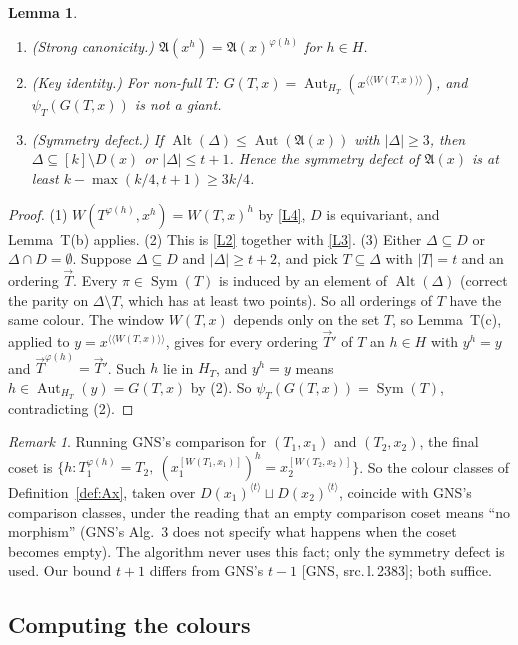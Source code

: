 \documentclass[11pt]{article}
\theoremstyle{plain}
\newtheorem{lemma}[theorem]{Lemma}
\theoremstyle{definition}
\theoremstyle{remark}
\newtheorem{remark}[theorem]{Remark}
\theoremstyle{named}
\theoremstyle{namedrm}
\newcommand{\Sym}{\operatorname{Sym}}
\newcommand{\Alt}{\operatorname{Alt}}
\newcommand{\Aut}{\operatorname{Aut}}
\newcommand{\fA}{\mathfrak{A}}
\newcommand{\vT}{\vec{T}}
\newcommand{\win}[2]{#1^{[#2]}}
\newcommand{\lay}[2]{#1^{\langle\!\langle #2\rangle\!\rangle}}
\newcommand{\src}[2]{[#1, src.\,l.\,#2]}
\begin{document}
\begin{lemma}\label{lem:Tprime}
\begin{enumerate}
\item (Strong canonicity.) $\fA(x^h)=\fA(x)^{\varphi(h)}$ for $h\in H$.
\item (Key identity.) For non-full $T$: $G(T,x)=\Aut_{H_T}(\lay{x}{W(T,x)})$, and $\psi_T(G(T,x))$ is not a
  giant.
\item (Symmetry defect.) If $\Alt(\Delta)\le\Aut(\fA(x))$ with $|\Delta|\ge3$, then $\Delta\subseteq[k]\setminus D(x)$ or
  $|\Delta|\le t+1$. Hence the symmetry defect of $\fA(x)$ is at least $k-\max(k/4,t+1)\ge3k/4$.
\end{enumerate}
\end{lemma}
\begin{proof}
(1) $W(T^{\varphi(h)},x^h)=W(T,x)^h$ by \ref{L4}, $D$ is equivariant, and Lemma~T(b) applies.
(2) This is \ref{L2} together with \ref{L3}.
(3) Either $\Delta\subseteq D$ or $\Delta\cap D=\emptyset$. Suppose $\Delta\subseteq D$ and $|\Delta|\ge t+2$, and pick $T\subseteq\Delta$
with $|T|=t$ and an ordering $\vT$. Every $\pi\in\Sym(T)$ is induced by an element of $\Alt(\Delta)$ (correct the
parity on $\Delta\setminus T$, which has at least two points). So all orderings of $T$ have the same colour. The
window $W(T,x)$ depends only on the set $T$, so Lemma~T(c), applied to $y=\lay{x}{W(T,x)}$, gives for every
ordering $\vT'$ of $T$ an $h\in H$ with $y^h=y$ and $\vT^{\varphi(h)}=\vT'$. Such $h$ lie in $H_T$, and $y^h=y$ means
$h\in\Aut_{H_T}(y)=G(T,x)$ by (2). So $\psi_T(G(T,x))=\Sym(T)$, contradicting (2).
\end{proof}

\begin{remark}
Running GNS's comparison \cite[Alg.~3]{GNS} for $(T_1,x_1)$ and $(T_2,x_2)$, the final coset is
$\{h:T_1^{\varphi(h)}=T_2,\ (\win{x_1}{W(T_1,x_1)})^h=\win{x_2}{W(T_2,x_2)}\}$. So the colour classes of
Definition~\ref{def:Ax}, taken over $D(x_1)^{\langle t\rangle}\sqcup D(x_2)^{\langle t\rangle}$, coincide with GNS's
comparison classes, under the reading that an empty comparison coset means ``no morphism''
(GNS's Alg.~3 does not specify what happens when the coset becomes empty). The algorithm never uses
this fact; only the symmetry defect is used. Our bound $t+1$ differs from GNS's $t-1$
\src{GNS}{2383}; both suffice.
\end{remark}

\subsection{Computing the colours}
\end{document}
